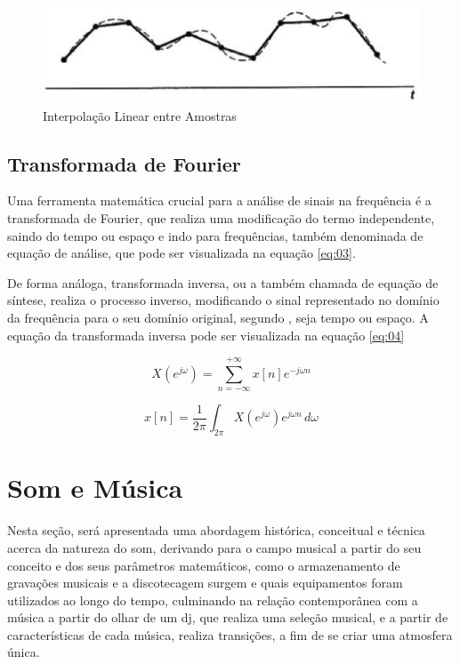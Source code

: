\begin{figure}[h]
	\centering
    \includegraphics[scale=0.4]{figuras/fig06.eps}
	\caption{Interpolação Linear entre Amostras}
	\label{fig06}
\end{figure}

\subsection{Transformada de Fourier}
Uma ferramenta matemática crucial para a análise de sinais na frequência é a transformada de Fourier, que realiza uma modificação do termo independente, saindo do tempo ou espaço e indo para frequências, também denominada de equação de análise, que pode ser visualizada na equação \ref{eq:03}. \par De forma análoga, transformada inversa, ou a também chamada de equação de síntese, realiza o processo inverso, modificando o sinal representado no domínio da frequência para o seu domínio original, segundo \cite{oppenheim2010sinais}, seja tempo ou espaço. A equação da transformada inversa pode ser visualizada na equação \ref{eq:04}

\begin{equation}  \label{eq:03}
X(e^{j\omega})= \sum_{n=-\infty}^{+\infty} x[n]e^{-j\omega n}
\end{equation}

\begin{equation}  \label{eq:04}
x[n]=\frac{1}{2\pi} \int_{2\pi}^{} X(e^{j\omega})e^{j\omega n} \,d\omega
\end{equation}



\newpage
\section{Som e Música}
Nesta seção, será apresentada uma abordagem histórica, conceitual e técnica acerca da natureza do som, derivando para o campo musical a partir do seu conceito e dos seus parâmetros matemáticos, como o armazenamento de gravações musicais e a discotecagem surgem e quais equipamentos foram utilizados ao longo do tempo, culminando na relação contemporânea com a música a partir do olhar de um dj, que realiza uma seleção musical, e a partir de características de cada música, realiza transições, a fim de se criar uma atmosfera única.

